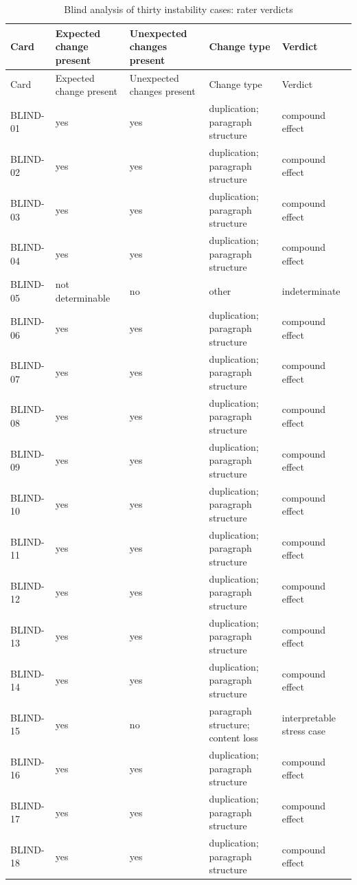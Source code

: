 \begingroup\scriptsize
\begin{longtable}{lp{2.5cm}p{2.5cm}p{3.3cm}p{3.1cm}}
\caption{Blind analysis of thirty instability cases: rater verdicts}\label{tab:s10} \\
\toprule
Card & Expected change present & Unexpected changes present & Change type & Verdict \\
\midrule
\endfirsthead
\toprule
Card & Expected change present & Unexpected changes present & Change type & Verdict \\
\midrule
\endhead
\bottomrule
\endfoot
BLIND-01 & yes & yes & duplication; paragraph structure & compound effect \\
BLIND-02 & yes & yes & duplication; paragraph structure & compound effect \\
BLIND-03 & yes & yes & duplication; paragraph structure & compound effect \\
BLIND-04 & yes & yes & duplication; paragraph structure & compound effect \\
BLIND-05 & not determinable & no & other & indeterminate \\
BLIND-06 & yes & yes & duplication; paragraph structure & compound effect \\
BLIND-07 & yes & yes & duplication; paragraph structure & compound effect \\
BLIND-08 & yes & yes & duplication; paragraph structure & compound effect \\
BLIND-09 & yes & yes & duplication; paragraph structure & compound effect \\
BLIND-10 & yes & yes & duplication; paragraph structure & compound effect \\
BLIND-11 & yes & yes & duplication; paragraph structure & compound effect \\
BLIND-12 & yes & yes & duplication; paragraph structure & compound effect \\
BLIND-13 & yes & yes & duplication; paragraph structure & compound effect \\
BLIND-14 & yes & yes & duplication; paragraph structure & compound effect \\
BLIND-15 & yes & no & paragraph structure; content loss & interpretable stress case \\
BLIND-16 & yes & yes & duplication; paragraph structure & compound effect \\
BLIND-17 & yes & yes & duplication; paragraph structure & compound effect \\
BLIND-18 & yes & yes & duplication; paragraph structure & compound effect \\

\end{longtable}

